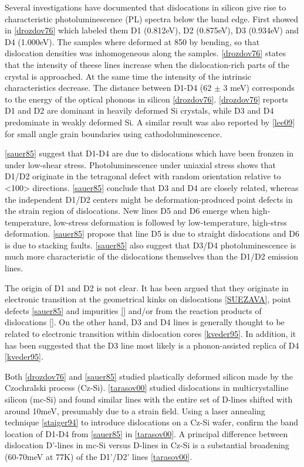 Several investigations have documented that dislocations in silicon give rise to characteristic photoluminescence (PL) spectra below the band edge. First showed in \ref{drozdov76} which labeled them D1 (0.812eV), D2 (0.875eV), D3 (0.934eV) and D4 (1.000eV). The samples where deformed at 850 \degrees by bending, so that dislocation densities was inhomogeneous along the samples. \ref{drozdov76} states that the intensity of theese lines increase when the dislocation-rich parts of the crystal is approached. At the same time the intensity of the intrinsic characteristics decrease. The distance between D1-D4 (62 $\pm$ 3 meV) corresponds to the energy of the optical phonons in silicon \ref{drozdov76}. \ref{drozdov76} reports D1 and D2 are dominant in heavily deformed Si crystals, while D3 and D4 predominate in weakly deformed Si. A similar result was also reported by \ref{lee09} for small angle grain boundaries using cathodoluminescence.

\ref{sauer85} suggest that D1-D4 are due to dislocations which have been fronzen in under low-shear stress. Photoluminescence under uniaxial stress shows that D1/D2 originate in the tetragonal defect with random orientation relative to <100> directions. \ref{sauer85} conclude that D3 and D4 are closely related, whereas the independent D1/D2 centers might be deformation-produced point defects in the strain region of dislocations. New lines D5 and D6 emerge when high-temperature, low-stress deformation is followed by low-temperature, high-strss deformation. \ref{sauer85} propose that line D5 is due to straight dislocations and D6 is due to stacking faults. \ref{sauer85} also suggest that D3/D4 photoluminescence is much more characteristic of the dislocations themselves than the D1/D2 emission lines.


The origin of D1 and D2 is not clear. It has been argued that they originate in electronic transition at the geometrical kinks on dislocations \ref{SUEZAVA}, point defects \ref{sauer85} and impurities \ref{} and/or from the reaction products of dislocations \ref{}. On the other hand, D3 and D4 lines is generally thought to be related to electronic transition within dislocation cores \ref{kveder95}. In addition, it has been suggested that the D3 line most likely is a phonon-assisted replica of D4 \ref{kveder95}.




Both \ref{drozdov76} and \ref{sauer85} studied plastically deformed silicon made by the Czochralski process (Cz-Si). \ref{tarasov00} studied  dislocations in multicrystalline silicon (mc-Si) and found similar lines with the entire set of D-lines shifted with around 10meV, presumably due to a strain field. Using a laser annealing technique \ref{staiger94} to introduce dislocations on a Cz-Si wafer, confirm the band location of D1-D4 from \ref{sauer85} in \ref{tarasov00}. A principal difference between dislocation D'-lines in mc-Si versus D-lines in Cz-Si is a substantial broadening (60-70meV at 77K) of the D1'/D2' lines \ref{tarasov00}.


